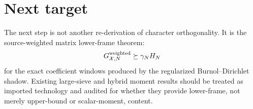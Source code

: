 \documentclass[11pt]{article}
\begin{document}
\section{Next target}
The next step is not another re-derivation of character orthogonality.  It is the source-weighted matrix lower-frame theorem:
\[
G_{\mathcal X,N}^{\rm weighted}\succeq\gamma_NH_N
\]
for the exact coefficient windows produced by the regularized Burnol--Dirichlet shadow.  Existing large-sieve and hybrid moment results should be treated as imported technology and audited for whether they provide lower-frame, not merely upper-bound or scalar-moment, content.
\end{document}
